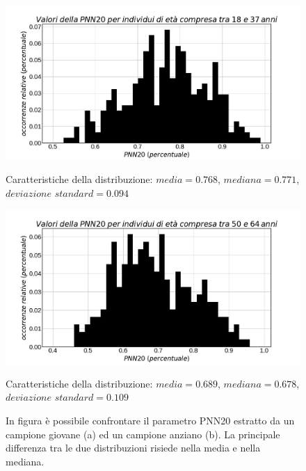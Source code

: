 \documentclass[a4paper, 12pt]{book}
\begin{document}
\begin{figure}[htbp]
\centering
\begin{minipage}[c]{.5\textwidth}
\centering%
\includegraphics[width=\textwidth]{PNN20-y.jpg}
\caption{Caratteristiche della distribuzione: $media=0.768$, $mediana=0.771$, $deviazione$ $standard = 0.094$}
\end{minipage}%
\hspace{10mm}%
\begin{minipage}[c]{.5\textwidth}
\centering%
\includegraphics[width=\textwidth]{PNN20-o.jpg}
\caption{Caratteristiche della distribuzione: $media=0.689$, $mediana=0.678$, $deviazione$ $standard = 0.109$}
\end{minipage}
\caption{In figura è possibile confrontare il parametro PNN20 estratto da un campione giovane (a) ed un campione anziano (b).
    La principale differenza tra le due distribuzioni risiede nella media e nella mediana.
}
\label{fig:PNN20}
\end{figure}
\end{document}
